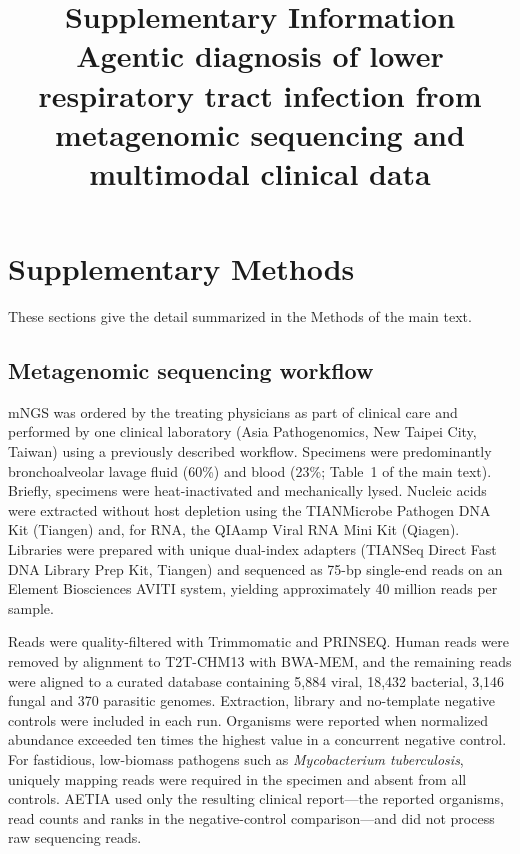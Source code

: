 \documentclass[11pt,a4paper]{article}
\title{Supplementary Information\\[4pt]\large Agentic diagnosis of lower respiratory tract infection from metagenomic sequencing and multimodal clinical data}
\author{}
\date{}
\newcommand{\toolname}{AETIA\xspace}
\newcommand{\mngs}{mNGS\xspace}
\begin{document}
\sloppy
\onehalfspacing
\maketitle
\tableofcontents

\clearpage
\section*{Supplementary Methods}
These sections give the detail summarized in the Methods of the main text.

\subsection*{Metagenomic sequencing workflow}
\mngs was ordered by the treating physicians as part of clinical care and performed by one clinical laboratory (Asia Pathogenomics, New Taipei City, Taiwan) using a previously described workflow\cite{chou2025investigating,takahashi2026diagnostic}. Specimens were predominantly bronchoalveolar lavage fluid (60\%) and blood (23\%; Table~1 of the main text). Briefly, specimens were heat-inactivated and mechanically lysed. Nucleic acids were extracted without host depletion using the TIANMicrobe Pathogen DNA Kit (Tiangen) and, for RNA, the QIAamp Viral RNA Mini Kit (Qiagen)\cite{chou2025investigating}. Libraries were prepared with unique dual-index adapters (TIANSeq Direct Fast DNA Library Prep Kit, Tiangen) and sequenced as 75-bp single-end reads on an Element Biosciences AVITI system, yielding approximately 40 million reads per sample\cite{takahashi2026diagnostic}.

Reads were quality-filtered with Trimmomatic\cite{bolger2014trimmomatic} and PRINSEQ\cite{schmieder2011quality}. Human reads were removed by alignment to T2T-CHM13\cite{nurk2022complete} with BWA-MEM\cite{li2013aligning}, and the remaining reads were aligned to a curated database containing 5,884 viral, 18,432 bacterial, 3,146 fungal and 370 parasitic genomes\cite{takahashi2026diagnostic}. Extraction, library and no-template negative controls were included in each run. Organisms were reported when normalized abundance exceeded ten times the highest value in a concurrent negative control. For fastidious, low-biomass pathogens such as \textit{Mycobacterium tuberculosis}, uniquely mapping reads were required in the specimen and absent from all controls\cite{takahashi2026diagnostic}. \toolname used only the resulting clinical report---the reported organisms, read counts and ranks in the negative-control comparison---and did not process raw sequencing reads.
\end{document}
